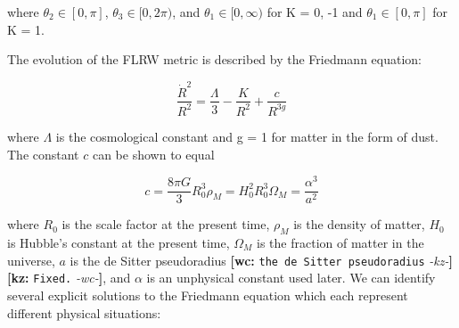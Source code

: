 \documentclass[preprint,notitlepage,amsmath,amssymb,floatfix]{revtex4-1}
\newcommand{\XXX}[3]{{\bf [#1: } {\tt #3} {\it -#2-}{\bf ]}}
\begin{document}
\noindent where $\theta_2\in[0,\pi]$, $\theta_3\in[0,2\pi)$, and $\theta_1\in[0,\infty)$ for K = 0, -1 and $\theta_1\in[0,\pi]$ for K = 1. \par
The evolution of the FLRW metric is described by the Friedmann equation:

\begin{equation}
\frac{\dot{R}^2}{R^2} = \frac{\Lambda}{3} - \frac{K}{R^2} + \frac{c}{R^{3g}}
\end{equation}

\noindent where $\Lambda$ is the cosmological constant and g = 1 for matter in the form of dust.  The constant $c$ can be shown to equal

\begin{equation}
c = \frac{8\pi G}{3}R_0^3\rho_M = H_0^2R_0^3\Omega_M = \frac{\alpha^3}{a^2}
\end{equation}

\noindent where $R_0$ is the scale factor at the present time, $\rho_M$ is the density of matter, $H_0$ is Hubble's constant at the present time, $\Omega_M$ is the fraction of matter in the universe, $a$ is the de Sitter pseudoradius \XXX{wc}{kz}{the de Sitter pseudoradius} \XXX{kz}{wc}{Fixed.}, and $\alpha$ is an unphysical constant used later.  We can identify several explicit solutions to the Friedmann equation which each represent different physical situations:
\end{document}
